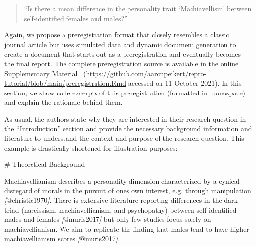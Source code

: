 \documentclass[psych,tutorial,accept,moreauthors,pdftex]{Definitions/mdpi}
\newenvironment{Shaded}{\begin{snugshade}}{\end{snugshade}}
\newcommand{\CommentTok}[1]{\textcolor[rgb]{0.56,0.35,0.01}{\textit{#1}}}
\newcommand{\FunctionTok}[1]{\textcolor[rgb]{0.00,0.00,0.00}{#1}}
\newcommand{\NormalTok}[1]{#1}
\newcommand{\OtherTok}[1]{\textcolor[rgb]{0.56,0.35,0.01}{#1}}
\begin{document}
\begin{paracol}{2}
\begin{quote}
``Is there a mean difference in the personality trait `Machiavellism'
between self-identified females and males?''
\end{quote}

Again, we propose a preregistration format that closely resembles a
classic journal article but uses simulated data and dynamic document
generation to create a document that starts out as a preregistration and
eventually becomes the final report. The complete preregistration source
is available in the {online Supplementary Material}
~(\url{https://github.com/aaronpeikert/repro-tutorial/blob/main/preregistration.Rmd} accessed on 11 October 2021). In this section, we show code excerpts of this
preregistration (formatted in monospace) and explain the rationale
behind them.

As usual, the authors state why they are interested in their research
question in the ``Introduction'' section and provide the necessary
background information and literature to understand the context and
purpose of the research question. This example is drastically shortened
for illustration purposes:

\vspace{+6pt}
\end{paracol}
\nointerlineskip
\begin{adjustwidth}{0.5cm}{0cm} 
\begin{Shaded}
\begin{Highlighting}[]
\FunctionTok{\# Theoretical Background}

\NormalTok{Machiavellianism describes a personality dimension characterized by a}
\NormalTok{cynical disregard of morals in the pursuit of one\textquotesingle{}s own interest, e.g.}
\NormalTok{through manipulation }\CommentTok{[}\OtherTok{@christie1970}\CommentTok{]}\NormalTok{. There is extensive literature reporting}
\NormalTok{differences in the dark triad (narcissism, machiavellianism, and psychopathy)}
\NormalTok{between self{-}identified males and females }\CommentTok{[}\OtherTok{@muris2017}\CommentTok{]}\NormalTok{ but only few studies}
\NormalTok{focus solely on machiavellianism. We aim to replicate the finding that males}
\NormalTok{tend to have higher machiavellianism scores }\CommentTok{[}\OtherTok{@muris2017}\CommentTok{]}\NormalTok{.}
\end{Highlighting}
\end{Shaded}
\end{adjustwidth}
\end{document}
